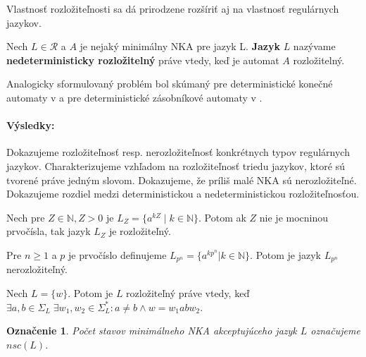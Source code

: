 \documentclass{svk_short_sk}
\newtheorem{notation}{Označenie}
\begin{document}
Vlastnosť rozložiteľnosti sa dá prirodzene rozšíriť aj na vlastnosť regulárnych jazykov.

\begin{definition}
\label{def:nedeterministic_decomposability_of_language}
Nech $ L \in \mathscr{R} $ a $ A $ je nejaký minimálny NKA pre jazyk L. \textbf{Jazyk} $ L $ nazývame \textbf{nedeterministicky rozložitelný} práve vtedy, keď je automat $ A $ rozložitelný.
\end{definition}

Analogicky sformulovaný problém bol skúmaný pre deterministické konečné automaty v \cite{Gazi} a pre deterministické zásobníkové automaty v \cite{Labath}.

\paragraph*{Výsledky:}

Dokazujeme rozložiteľnosť resp. nerozložiteľnosť konkrétnych typov regulárnych jazykov. Charakterizujeme vzhľadom na rozložiteľnosť triedu jazykov, ktoré sú tvorené práve jedným slovom. Dokazujeme, že príliš malé NKA sú nerozložiteľné. Dokazujeme rozdiel medzi deterministickou a nedeterministickou rozložiteľnosťou.
\begin{theorem}
\label{thm:compound}
Nech pre $ Z \in \mathbb{N}, Z > 0 $ je $ L_Z = \lbrace a^{kZ} \; | \; k \in \mathbb{N} \rbrace $. Potom ak $ Z $ nie je mocninou prvočísla, tak jazyk $ L_Z $ je rozložiteľný.
\end{theorem}

\begin{theorem}
\label{thm:prime^n}
Pre $ n \geq 1 $ a $ p $ je prvočíslo definujeme $ L_{p^n} = \lbrace a^{kp^{n}} | k \in \mathbb{N} \rbrace $. Potom je jazyk $ L_{p^n} $ nerozložiteľný.
\end{theorem}

\begin{theorem}
\label{thm:singleton_characterization}
Nech $ L = \lbrace w \rbrace $. Potom je $ L $ rozložiteľný práve vtedy, keď $ \exists a,b \in \Sigma_L \; \exists w_1,w_2 \in \Sigma_L^*: a \neq b \wedge w=w_1abw_2 $.
\end{theorem}

\begin{notation}
Počet stavov minimálneho NKA akceptujúceho jazyk $ L $ označujeme \em{}$ nsc(L) $\em{}.
\end{notation}
\end{document}
